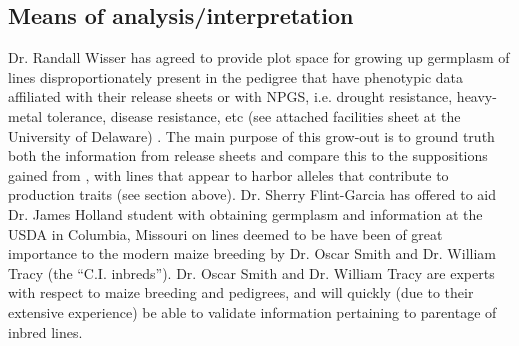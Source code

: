 \documentclass[draft,12pt]{article}
\begin{document}
\subsection*{Means of analysis/interpretation}
Dr. Randall Wisser has agreed to provide plot space for growing up germplasm of lines disproportionately present in the pedigree that have phenotypic data affiliated with their release sheets or with NPGS, i.e. drought resistance, heavy-metal tolerance, disease resistance, etc (see attached facilities sheet at the University of Delaware) . 
The main purpose of this grow-out is to ground truth both the information from release sheets and compare this to the suppositions gained from \citep{Berg:2014bs}, with lines that appear to harbor alleles that contribute to production traits (see section above).
Dr. Sherry Flint-Garcia has offered to aid Dr. James Holland student with obtaining germplasm and information at the USDA in Columbia, Missouri on lines deemed to be have been of great importance to the modern maize breeding by Dr. Oscar Smith and Dr. William Tracy (the ``C.I. inbreds''). 
Dr. Oscar Smith and Dr. William Tracy are experts with respect to maize breeding and pedigrees, and will quickly (due to their extensive experience) be able to validate information pertaining to parentage of inbred lines.
\end{document}
